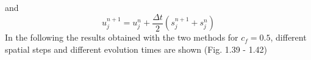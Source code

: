 \documentclass[11pt,a4paper]{article}
\begin{document}
and
\begin{equation}
u_j^{n+1} = u_j^n + \frac{\Delta t}{2} ( s_j^{n+1} + s_j^n )
\end{equation}
In the following the results obtained with the two methods for $c_f = 0.5$, different spatial steps and different evolution times are shown (Fig. 1.39 - 1.42)
\begin{figure}[!h]
\centering
{}
\end{figure}\\
\end{document}
